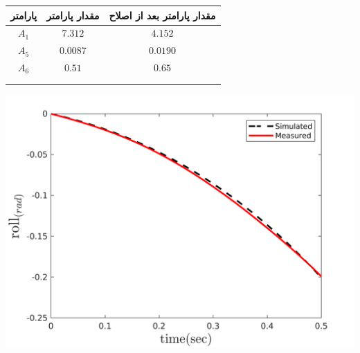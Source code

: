   \begin{minipage}[!ht]{\linewidth}
	\hfill
	\begin{minipage}[b]{0.49\linewidth}
		\centering
		\begin{tabular}{ccc}\hline
			 پارامتر & مقدار پارامتر  & مقدار پارامتر بعد از اصلاح
			 \\ \hline
			$A_1$  & $7.312$ & $4.152$ \\
			$A_5$ & $0.0087$ & $0.0190$\\
			$A_6$ & $0.51$ & $0.65$\\\\\\
		\end{tabular}
	\end{minipage}
	\begin{minipage}[b]{0.48\linewidth}
		\centering
		\includegraphics[width=1\linewidth]{../Figures/RCP/roll_ml_parameter_estimation/RCP_roll_S2.png}
	\end{minipage}
\end{minipage}
